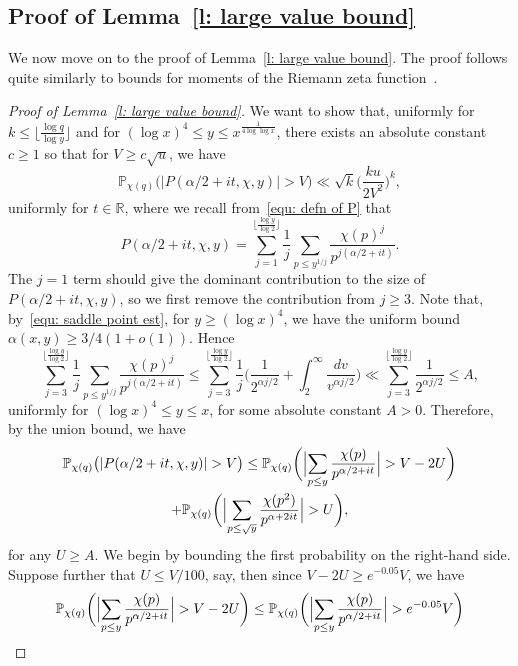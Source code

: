 \documentclass[a4paper,12pt,reqno]{amsart}
\newcommand{\R}{\mathbb{R}}
\newcommand{\p}{\mathbb{P}}
\begin{document}
\subsection{Proof of Lemma~\ref{l: large value bound}}
We now move on to the proof of Lemma~\ref{l: large value bound}. The proof follows quite similarly to bounds for moments of the Riemann zeta function~\cite{SoundMoments}.
\begin{proof}[Proof of Lemma~\ref{l: large value bound}]
We want to show that, uniformly for $k \leq \lfloor \frac{\log q}{\log y} \rfloor$ and for $(\log x)^4 \leq y \leq x^{\frac{1}{4 \log \log x}}$, there exists an absolute constant $c \geq 1$ so that for $V \geq c \sqrt{u}$, we have
\[
\p_{\chi(q)} \bigl( |P (\alpha / 2 + it, \chi, y) | > V \bigr) \ll \sqrt{k} \biggl( \frac{k u}{2 V^2} \biggr)^{k} ,
\]
uniformly for $t \in \R$, where we recall from~\eqref{equ: defn of P} that
\[
P (\alpha/2+it, \chi, y) = \sum_{j=1}^{\lfloor \frac{\log y}{\log 2} \rfloor} \frac{1}{j} \sum_{p \leq y^{1/j}} \frac{\chi(p)^j}{p^{j (\alpha/2+it)}}.
\]
The $j=1$ term should give the dominant contribution to the size of $P (\alpha / 2 + it, \chi, y)$, so we first remove the contribution from $j \geq 3$. Note that, by~\eqref{equ: saddle point est}, for $y \geq (\log x)^4$, we have the uniform bound $\alpha (x,y) \geq 3/4 (1+o(1))$. Hence
\[
\sum_{j=3}^{\lfloor \frac{\log y}{\log 2} \rfloor} \frac{1}{j} \sum_{p \leq y^{1/j}} \frac{\chi(p)^j}{p^{j (\alpha/2+it)}} \leq \sum_{j=3}^{\lfloor \frac{\log y}{\log 2} \rfloor} \frac{1}{j} \biggl( \frac{1}{2^{\alpha j / 2}} + \int_{2}^{\infty} \frac{d v}{v^{\alpha j / 2}} \biggr) \ll \sum_{j=3}^{\lfloor \frac{\log y}{\log 2} \rfloor} \frac{1}{2^{\alpha j / 2}} \leq A ,
\]
uniformly for $(\log x)^4 \leq y \leq x$, for some absolute constant $A > 0$. Therefore, by the union bound, we have
\begin{multline}\label{equ: union bound}
\p_{\chi(q)} \bigl( |P (\alpha / 2 + it, \chi, y) | > V \bigr) \leq \p_{\chi(q)} \biggl( \Bigl| \sum_{p \leq y} \frac{\chi (p)}{p^{\alpha / 2 + it}} \Bigr| > V - 2 U \biggr) \\ 
+ \p_{\chi(q)}\biggl( \Bigl| \sum_{p \leq \sqrt{y}} \frac{\chi(p^2)}{p^{\alpha + 2it}} \Bigr| > U \biggr),
\end{multline}
for any $U \geq A$. We begin by bounding the first probability on the right-hand side. Suppose further that $U \leq V/100$, say, then since $V - 2U \geq e^{-0.05} V$, we have
\[
\p_{\chi(q)} \biggl( \Bigl| \sum_{p \leq y} \frac{\chi (p)}{p^{\alpha / 2 + it}} \Bigr| > V - 2 U \biggr) \leq \p_{\chi(q)} \biggl( \Bigl| \sum_{p \leq y} \frac{\chi (p)}{p^{\alpha / 2 + it}} \Bigr| > e^{-0.05} V \biggr)
\]
\end{proof}
\end{document}
